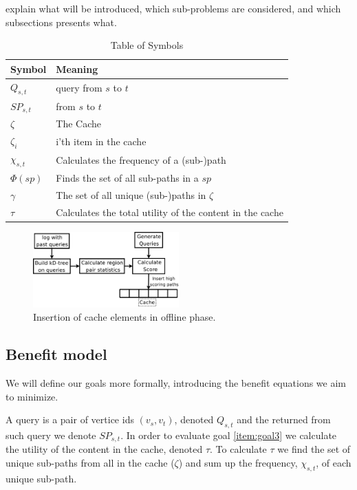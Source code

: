 explain what will be introduced, which sub-problems are considered, and which subsections presents what.


\begin{table}
\begin{tabular*}{\columnwidth}{|l||p{}|}
\hline
\bf Symbol		& \bf Meaning \\\hline
$Q_{s,t}$		& \spath query from $s$ to $t$ \\\hline
$SP_{s,t}$		& \spath from $s$ to $t$ \\\hline
$\zeta$ 		& The Cache \\\hline
$\zeta_i$		& i'th item in the cache \\\hline
$\chi_{s,t}$		& Calculates the frequency of a (sub-)path \\\hline
$\Phi(sp)$		& Finds the set of all sub-paths in a \spath $sp$ \\\hline
$\gamma$		& The set of all unique (sub-)paths in $\zeta$ \\\hline
$\tau$			& Calculates the total utility of the content in the cache \\\hline 
\end{tabular*}
\caption{Table of Symbols}
\label{tab:symbols}
\end{table}


\begin{figure}[bht]
  \center
        \includegraphics[width=0.5\textwidth]{figures/fillcache}
        \caption{Insertion of cache elements in offline phase.}
  \label{fig:fillcache}
\end{figure}


\subsection{Benefit model}

We will define our goals more formally, introducing the benefit equations we aim to minimize.

A query is a pair of vertice ids $(v_s, v_t)$, denoted $Q_{s,t}$ and the \spath returned from such query we denote $SP_{s,t}$. 
In order to evaluate goal \ref{item:goal3} we calculate the utility of the content in the cache, denoted $\tau$. To calculate $\tau$ we find the set of unique sub-paths from all \spaths in the cache ($\zeta$) and sum up the frequency, $\chi_{s,t}$, of each unique sub-path.

